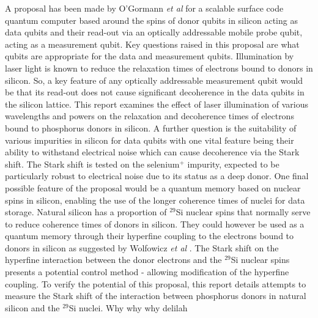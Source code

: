 
A proposal has been made by O'Gormann \emph{et al} \cite{OGorman2014} for a scalable surface code quantum computer based around the spins of donor qubits in silicon acting as data qubits and their read-out via an optically addressable mobile probe qubit, acting as a measurement qubit. Key questions raised in this proposal are what qubits are appropriate for the data and measurement qubits.
Illumination by laser light is known to reduce the relaxation times of electrons bound to donors in silicon. So, a key feature of any optically addressable measurement qubit would be that its read-out does not cause significant decoherence in the data qubits in the silicon lattice. This report examines the effect of laser illumination of various wavelengths and powers on the relaxation and decoherence times of electrons bound to phosphorus donors in silicon.
A further question is the suitability of various impurities in silicon for data qubits with one vital feature being their ability to withstand electrical noise which can cause decoherence via the Stark shift.
The Stark shift is tested on the selenium$^{+}$ impurity, expected to be particularly robust to electrical noise due to its status as a deep donor.
One final possible feature of the proposal would be a quantum memory based on nuclear spins in silicon, enabling the use of the longer coherence times of nuclei for data storage.
Natural silicon has a proportion of $^{29}$Si nuclear spins that normally serve to reduce coherence times of donors in silicon. They could however be used as a quantum memory through their hyperfine coupling to the electrons bound to donors in silicon as suggested by Wolfowicz \emph{et al} \cite{Wolfowicz2016a}. The Stark shift on the hyperfine interaction between the donor electrons and the $^{29}$Si nuclear spins presents a potential control method - allowing modification of the hyperfine coupling. To verify the potential of this proposal, this report details attempts to measure the Stark shift of the interaction between phosphorus donors in natural silicon and the $^{29}$Si nuclei.
Why why why delilah